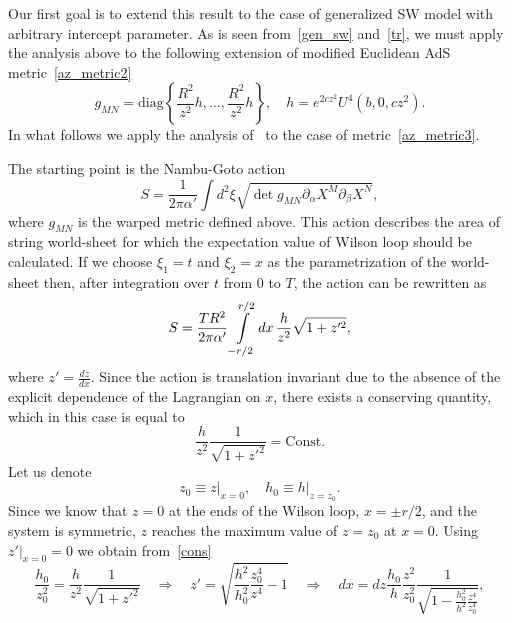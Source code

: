 \documentclass[a4paper,11pt]{article}
\newcommand{\qrq}{\quad\Rightarrow\quad}
\begin{document}
Our first goal is to extend this result to the case of generalized SW model with arbitrary
intercept parameter. As is seen from~\eqref{gen_sw} and~\eqref{tr}, we must apply the analysis above
to the following extension of modified Euclidean AdS metric~\eqref{az_metric2}
\begin{equation}
\label{az_metric3}
  g_{MN}=\text{diag}\left\lbrace\frac{R^2}{z^2}h,\dots,\frac{R^2}{z^2}h\right\rbrace,\quad
  h=e^{2cz^2}U^4(b,0,cz^2).
\end{equation}
In what follows we apply the analysis of~\cite{Andreev:2006ct} to the case of metric~\eqref{az_metric3}.

The starting point is the Nambu-Goto action
\begin{equation}
\label{ng}
  S=\frac{1}{2\pi\alpha'}\int d^2\xi\sqrt{\det g_{MN}\partial_\alpha X^M\partial_\beta X^N},
\end{equation}
where \(g_{MN}\) is the warped metric defined above. This action
describes the area of string world-sheet for which the expectation value of Wilson loop
should be calculated. If we choose \(\xi_1=t\) and \(\xi_2=x\) as the parametrization of the
world-sheet then, after integration over \(t\) from \(0\) to \(T\), the action
can be rewritten as
\begin{equation}
\label{ng_action}
  S=\frac{TR^2}{2\pi\alpha'}\int\displaylimits_{-r/2}^{r/2}dx\,
  \frac{h}{z^2}\sqrt{1+z'^2},
\end{equation}
where $z'=\frac{dz}{dx}$.
Since the action is translation invariant due to the absence of the explicit dependence
of the Lagrangian on \(x\), there exists a conserving quantity, which in this case is
equal to
\begin{equation}
\label{cons}
  \frac{h}{z^2}\frac{1}{\sqrt{1+z'^2}}=\text{Const}.
\end{equation}
Let us denote
\begin{equation}
  z_0\equiv\left.z\right|_{x=0},\quad
  h_0\equiv\left.h\right|_{z=z_0}.
\end{equation}
Since we know that \(z=0\) at the ends of the Wilson loop, \(x=\pm r/2\), and the system
is symmetric, $z$ reaches the maximum value of \(z=z_0\) at $x=0$. Using \(\left.z'\right|_{x=0}=0\)
we obtain from~\eqref{cons}
\begin{equation}
  \frac{h_0}{z_0^2}=\frac{h}{z^2}\frac{1}{\sqrt{1+z'^2}}\qrq
  z'=\sqrt{\frac{h^2}{h_0^2}\frac{z_0^4}{z^4}-1}\qrq
  dx=dz\frac{h_0}{h}\frac{z^2}{z_0^2}\frac{1}{\sqrt{1-\frac{h_0^2}{h^2}\frac{z^4}{z_0^4}}},
\end{equation}
\end{document}
